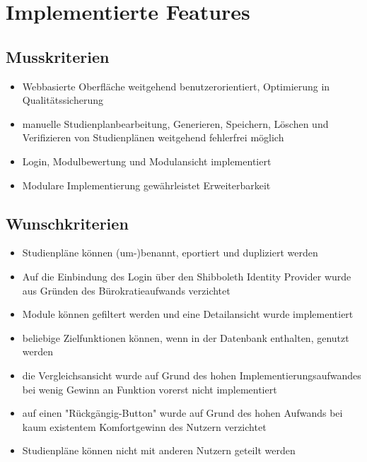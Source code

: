\section{Implementierte Features}
\subsection{Musskriterien}
\begin{itemize}[nosep]
	\item Webbasierte Oberfläche weitgehend benutzerorientiert, Optimierung in Qualitätssicherung
	\item manuelle Studienplanbearbeitung, Generieren, Speichern, Löschen und Verifizieren von Studienplänen weitgehend fehlerfrei möglich
	\item Login, Modulbewertung und Modulansicht implementiert
	\item Modulare Implementierung gewährleistet Erweiterbarkeit
	\end{itemize}
\subsection{Wunschkriterien}
	\begin{itemize}[nosep]
	\item Studienpläne können (um-)benannt, eportiert und dupliziert werden
	\item Auf die Einbindung des Login über den Shibboleth Identity Provider wurde aus Gründen des Bürokratieaufwands verzichtet
	\item Module können gefiltert werden und eine Detailansicht wurde implementiert
	\item beliebige Zielfunktionen können, wenn in der Datenbank enthalten, genutzt werden
	\item die Vergleichsansicht wurde auf Grund des hohen Implementierungsaufwandes bei wenig Gewinn an Funktion vorerst nicht implementiert
	\item  auf einen "Rückgängig-Button" wurde auf Grund des hohen Aufwands bei kaum existentem Komfortgewinn des Nutzern verzichtet
	\item Studienpläne können nicht mit anderen Nutzern geteilt werden
	\end{itemize}